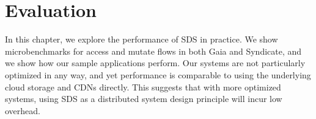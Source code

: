 \chapter{Evaluation}
\label{chap:evaluation}

In this chapter, we explore the performance of SDS in practice.  We show
microbenchmarks for access and mutate flows in both Gaia and Syndicate, and we
show how our sample applications perform.  Our systems are not particularly
optimized in any way, and yet performance is comparable to using the underlying
cloud storage and CDNs directly.  This suggests that with more optimized
systems, using SDS as a distributed system design principle will incur low overhead.


